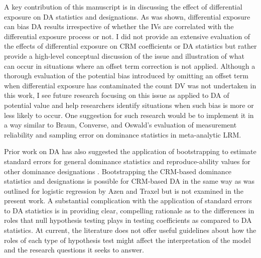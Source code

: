 \documentclass[ShortAfour,times,sageapa]{sagej}
\begin{document}
	A key contribution of this manuscript is in discussing the effect of differential exposure on DA statistics and designations.
	As was shown, differential exposure can bias DA results irrespective of whether the IVs are correlated with the differential exposure process or not.
	I did not provide an extensive evaluation of the effects of differential exposure on CRM coefficients or DA statistics but rather provide a high-level conceptual discussion of the issue and illustration of what can occur in situations where an offset term correction is not applied.
	Although a thorough evaluation of the potential bias introduced by omitting an offset term when differential exposure has contaminated the count DV was not undertaken in this work, I see future research focusing on this issue as applied to DA of potential value and help researchers identify situations when such bias is more or less likely to occur.
	One suggestion for such research would be to implement it in a way similar to Braun, Converse, and Oswald's \citeyear{braun2019accuracy} evaluation of measurement reliability and sampling error on dominance statistics in meta-analytic LRM.
	
	Prior work on DA has also suggested the application of bootstrapping to estimate standard errors for general dominance statistics and reproduce-ability values for other dominance designations \cite{azen2009using,braun2019accuracy}. 
	Bootstrapping the CRM-based dominance statistics and designations is possible for CRM-based DA in the same way as was outlined for logistic regression by Azen and Traxel \citeyear{azen2009using} but is not examined in the present work.
	A substantial complication with the application of standard errors to DA statistics is in providing clear, compelling rationale as to the differences in roles that null hypothesis testing plays in testing coefficients as compared to DA statistics.
	At current, the literature does not offer useful guidelines about how the roles of each type of hypothesis test might affect the interpretation of the model and the research questions it seeks to answer.
	
\end{document}
